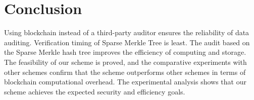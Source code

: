 \section{Conclusion}
Using blockchain instead of a third-party auditor ensures the reliability of data auditing. Verification timing of Sparse Merkle Tree is least. The audit based on the Sparse Merkle hash tree improves the efficiency of computing and storage.
The feasibility of our scheme is proved, and the comparative experiments with other schemes confirm that the scheme outperforms other schemes in terms of blockchain computational overhead.
The experimental analysis shows that our scheme achieves the expected security and efficiency goals.
